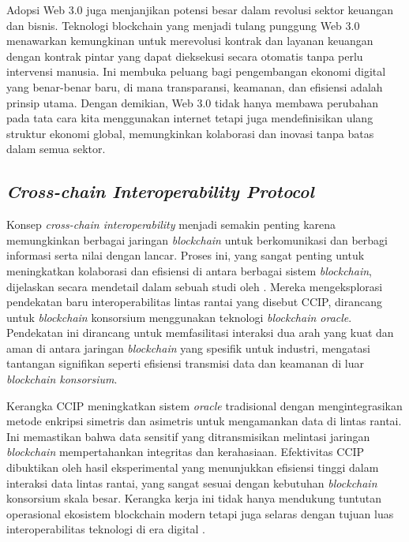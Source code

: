 Adopsi Web 3.0 juga menjanjikan potensi besar dalam revolusi sektor keuangan dan bisnis. Teknologi blockchain yang menjadi tulang punggung Web 3.0 menawarkan kemungkinan untuk merevolusi kontrak dan layanan keuangan dengan kontrak pintar yang dapat dieksekusi secara otomatis tanpa perlu intervensi manusia. Ini membuka peluang bagi pengembangan ekonomi digital yang benar-benar baru, di mana transparansi, keamanan, dan efisiensi adalah prinsip utama. Dengan demikian, Web 3.0 tidak hanya membawa perubahan pada tata cara kita menggunakan internet tetapi juga mendefinisikan ulang struktur ekonomi global, memungkinkan kolaborasi dan inovasi tanpa batas dalam semua sektor. \cite{bambacht2022web3}

\subsection{\emph{Cross-chain Interoperability Protocol}}
Konsep \emph{cross-chain interoperability} menjadi semakin penting karena memungkinkan berbagai jaringan \emph{blockchain} untuk berkomunikasi dan berbagi informasi serta nilai dengan lancar. Proses ini, yang sangat penting untuk meningkatkan kolaborasi dan efisiensi di antara berbagai sistem \emph{blockchain}, dijelaskan secara mendetail dalam sebuah studi oleh \cite{s23041864}. Mereka mengeksplorasi pendekatan baru interoperabilitas lintas rantai yang disebut CCIP, dirancang untuk \emph{blockchain} konsorsium menggunakan teknologi \emph{blockchain oracle}. Pendekatan ini dirancang untuk memfasilitasi interaksi dua arah yang kuat dan aman di antara jaringan \emph{blockchain} yang spesifik untuk industri, mengatasi tantangan signifikan seperti efisiensi transmisi data dan keamanan di luar \emph{blockchain konsorsium}.

Kerangka CCIP meningkatkan sistem \emph{oracle} tradisional dengan mengintegrasikan metode enkripsi simetris dan asimetris untuk mengamankan data di lintas rantai. Ini memastikan bahwa data sensitif yang ditransmisikan melintasi jaringan \emph{blockchain} mempertahankan integritas dan kerahasiaan. Efektivitas CCIP dibuktikan oleh hasil eksperimental yang menunjukkan efisiensi tinggi dalam interaksi data lintas rantai, yang sangat sesuai dengan kebutuhan \emph{blockchain} konsorsium skala besar. Kerangka kerja ini tidak hanya mendukung tuntutan operasional ekosistem blockchain modern tetapi juga selaras dengan tujuan luas interoperabilitas teknologi di era digital \cite{Pillai_Biswas_Muthukkumarasamy_2020}.